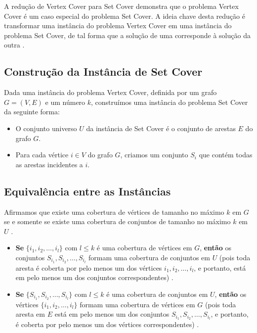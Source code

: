 \documentclass[12pt, a4paper]{report}
\begin{document}
A redução de Vertex Cover para Set Cover demonstra que o problema Vertex Cover é um caso especial do problema Set Cover. A ideia chave desta redução é transformar uma instância do problema Vertex Cover em uma instância do problema Set Cover, de tal forma que a solução de uma corresponde à solução da outra 
\cite{kleinberg2006algorithm}.

\subsection*{Construção da Instância de Set Cover}
Dada uma instância do problema Vertex Cover, definida por um grafo \(G = (V, E)\) e um número \(k\), construímos uma instância do problema Set Cover da seguinte forma:
\begin{itemize}
    \item O conjunto universo \(U\) da instância de Set Cover é o conjunto de arestas \(E\) do grafo \(G\).
    \item Para cada vértice \(i \in V\) do grafo \(G\), criamos um conjunto \(S_i\) que contém todas as arestas incidentes a \(i\).
\end{itemize}

\subsection*{Equivalência entre as Instâncias}
Afirmamos que existe uma cobertura de vértices de tamanho no máximo \(k\) em \(G\) se e somente se existe uma cobertura de conjuntos de tamanho no máximo \(k\) em \(U\) 
\cite{kleinberg2006algorithm}.
\begin{itemize}
    \item \textbf{Se} \( \{i_1, i_2, \dots, i_l\} \) com \(l \leq k\) é uma cobertura de vértices em \(G\), \textbf{então} os conjuntos \(S_{i_1}, S_{i_2}, \dots, S_{i_l}\) formam uma cobertura de conjuntos em \(U\) (pois toda aresta é coberta por pelo menos um dos vértices \(i_1, i_2, \dots, i_l\), e portanto, está em pelo menos um dos conjuntos correspondentes) 
    \cite{kleinberg2006algorithm}.
    \item \textbf{Se} \( \{S_{i_1}, S_{i_2}, \dots, S_{i_l}\} \) com \(l \leq k\) é uma cobertura de conjuntos em \(U\), \textbf{então} os vértices \( \{i_1, i_2, \dots, i_l\} \) formam uma cobertura de vértices em \(G\) (pois toda aresta em \(E\) está em pelo menos um dos conjuntos \(S_{i_1}, S_{i_2}, \dots, S_{i_l}\), e portanto, é coberta por pelo menos um dos vértices correspondentes) 
    \cite{kleinberg2006algorithm}.
\end{itemize}
\end{document}
